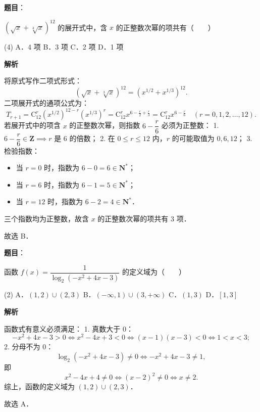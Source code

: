 \begin{answer}

\textbf{题目}：

$(\sqrt{x} + \sqrt[3]{x})^{12}$ 的展开式中，含 $x$ 的正整数次幂的项共有\mbox{（　　）}

\begin{gkopts}(4)
\task A．4 项
\task B．3 项
\task C．2 项
\task D．1 项
\end{gkopts}

\textbf{解析}

将原式写作二项式形式：
\nopagebreak[4]
\[
\left(\sqrt{x} + \sqrt[3]{x}\right)^{12} = \left(x^{1/2} + x^{1/3}\right)^{12}.
\]
二项展开式的通项公式为：
\nopagebreak[4]
\[
T_{r+1} = \mathrm{C}_{12}^r \left(x^{1/2}\right)^{12-r} \left(x^{1/3}\right)^r = \mathrm{C}_{12}^r x^{6 - \frac{r}{2} + \frac{r}{3}} = \mathrm{C}_{12}^r x^{6 - \frac{r}{6}} \quad (r = 0, 1, 2, \dots, 12).
\]
若展开式中的项含 $x$ 的正整数次幂，则指数 $6 - \dfrac{r}{6}$ 必须为正整数：
1. $6 - \dfrac{r}{6} \in \mathbf{Z} \implies r$ 是 $6$ 的倍数；
2. 在 $0 \leqslant r \leqslant 12$ 内，$r$ 的可能取值为 $0, 6, 12$；
3. 检验指数：
\begin{itemize}
\item 当 $r = 0$ 时，指数为 $6 - 0 = 6 \in \mathbf{N}^*$；
\item 当 $r = 6$ 时，指数为 $6 - 1 = 5 \in \mathbf{N}^*$；
\item 当 $r = 12$ 时，指数为 $6 - 2 = 4 \in \mathbf{N}^*$．
\end{itemize}
三个指数均为正整数，故含 $x$ 的正整数次幂的项共有 $3$ 项．

故选 B．


\end{answer}
\begin{answer}

\textbf{题目}：

函数 $f(x) = \dfrac{1}{\log_2(-x^2 + 4x - 3)}$ 的定义域为\mbox{（　　）}

\begin{gkopts}(2)
\task A．$(1, 2) \cup (2, 3)$
\task B．$(-\infty, 1) \cup (3, +\infty)$
\task C．$(1, 3)$
\task D．$[1, 3]$
\end{gkopts}

\textbf{解析}

函数式有意义必须满足：
1. 真数大于 $0$：
\nopagebreak[4]
\[
-x^2 + 4x - 3 > 0 \iff x^2 - 4x + 3 < 0 \iff (x - 1)(x - 3) < 0 \iff 1 < x < 3;
\]
2. 分母不为 $0$：
\nopagebreak[4]
\[
\log_2(-x^2 + 4x - 3) \neq 0 \iff -x^2 + 4x - 3 \neq 1,
\]
即
\nopagebreak[4]
\[
x^2 - 4x + 4 \neq 0 \iff (x - 2)^2 \neq 0 \iff x \neq 2.
\]
综上，函数的定义域为 $(1, 2) \cup (2, 3)$．

故选 A．


\end{answer}
